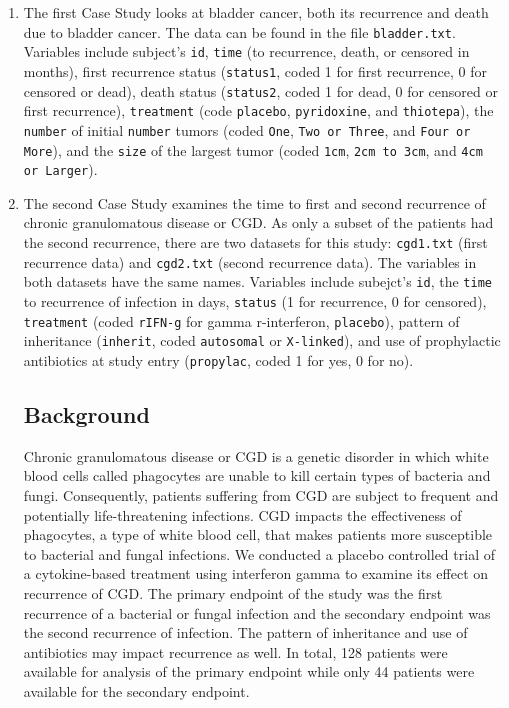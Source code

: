 \documentclass{article}
\begin{document}
	\begin{enumerate}
		\item The first Case Study looks at bladder cancer, both its recurrence and death due to bladder cancer. The data can be found in the file \texttt{bladder.txt}. Variables include subject's \texttt{id}, \texttt{time} (to recurrence, death, or censored in months), first recurrence status (\texttt{status1}, coded 1 for first recurrence, 0 for censored or dead), death status (\texttt{status2}, coded 1 for dead, 0 for censored or first recurrence), \texttt{treatment} (code \texttt{placebo}, \texttt{pyridoxine}, and \texttt{thiotepa}), the \texttt{number} of initial \texttt{number} tumors (coded \texttt{One}, \texttt{Two or Three}, and \texttt{Four or More}), and the \texttt{size} of the largest tumor (coded \texttt{1cm}, \texttt{2cm to 3cm}, and \texttt{4cm or Larger}).
		
		\item The second Case Study examines the time to first and second recurrence of chronic granulomatous disease or CGD. As only a subset of the patients had the second recurrence, there are two datasets for this study: \texttt{cgd1.txt} (first recurrence data) and \texttt{cgd2.txt} (second recurrence data). The variables in both datasets have the same names. Variables include subejct's \texttt{id}, the \texttt{time} to recurrence of infection in days, \texttt{status} (1 for recurrence, 0 for censored), \texttt{treatment} (coded \texttt{rIFN-g} for gamma r-interferon, \texttt{placebo}), pattern of inheritance (\texttt{inherit}, coded \texttt{autosomal} or \texttt{X-linked}), and use of prophylactic antibiotics at study entry (\texttt{propylac}, coded 1 for yes, 0 for no).

	\subsection*{Background}

	Chronic granulomatous disease or CGD is a genetic disorder in which white blood cells called phagocytes are unable to kill certain types of bacteria and fungi. Consequently, patients suffering from CGD are subject to frequent and potentially life-threatening infections. CGD impacts the effectiveness of phagocytes, a type of white blood cell, that makes patients more susceptible to bacterial and fungal infections. We conducted a placebo controlled trial of a cytokine-based treatment using interferon gamma to examine its effect on recurrence of CGD. The primary endpoint of the study was the first recurrence of a bacterial or fungal infection and the secondary endpoint was the second recurrence of infection. The pattern of inheritance and use of antibiotics may impact recurrence as well. In total, 128 patients were available for analysis of the primary endpoint while only 44 patients were available for the secondary endpoint.

		
	
	\end{enumerate}
\end{document}
